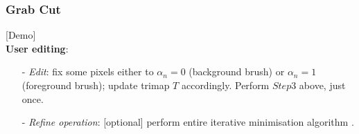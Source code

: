 \documentclass[notheorems,mathserif,table,compress]{beamer}  %
\begin{document}
\begin{frame}
\frametitle{Grab Cut}
{\color{blue} [Demo]}\\
\textbf{User editing}:
\begin{itemize}
\item[-] \emph{Edit}: fix some pixels either to $\alpha_{n}=0$ (background brush) or $\alpha_{n}=1$ (foreground brush); update trimap $T$ accordingly. Perform $Step 3$ above, just once.
\item[-] \emph{Refine operation}: [optional] perform entire iterative minimisation algorithm .
\end{itemize}
\end{frame}

   
\end{document}
